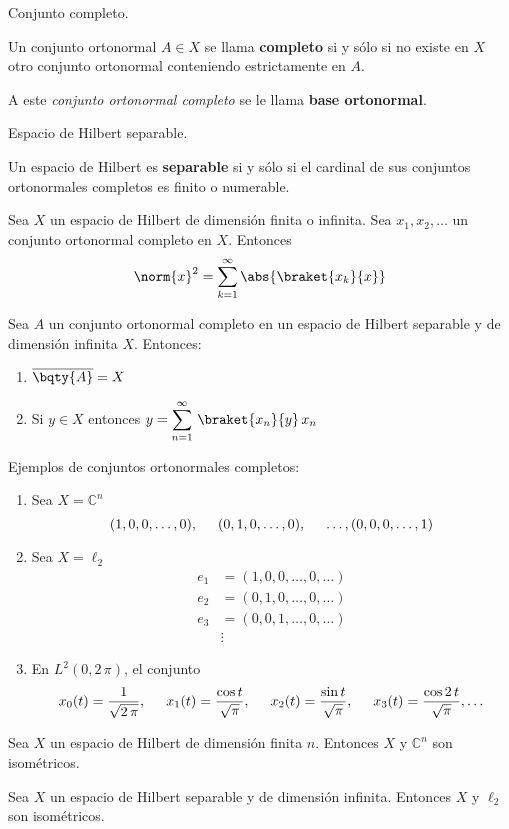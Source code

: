 \begin{defi} Conjunto completo.

Un conjunto ortonormal $A \in X$ se llama \textbf{completo} si y sólo si no existe en $X$ otro conjunto ortonormal conteniendo estrictamente en $A$.

A este \textit{conjunto ortonormal completo} se le llama \textbf{base ortonormal}.
\end{defi}
\begin{defi} Espacio de Hilbert separable.

Un espacio de Hilbert es \textbf{separable} si y sólo si el cardinal de sus conjuntos ortonormales completos es finito o numerable.
\end{defi}
\begin{teo}
Sea $X$ un espacio de Hilbert de dimensión finita o infinita. Sea ${x_{1}, x_{2}, \ldots}$ un conjunto ortonormal completo en $X$. Entonces
\[ \norm{x}^{2} = \sum_{k=1}^{\infty} \abs{\braket{x_{k}}{x}} \]
\end{teo}
\begin{teo}
 Sea $A$ un conjunto ortonormal completo en un espacio de Hilbert separable y de dimensión infinita $X$. Entonces:
 \begin{enumerate}[label=\roman*.]
\item $\overline{\bqty{A}} = X$
\item Si $y \in X$ entonces $\displaystyle{y = \sum_{n=1}^{\infty} \, \braket{x_{n}}{y} \, x_{n}}$
 \end{enumerate}
\end{teo}
Ejemplos de conjuntos ortonormales completos:
\begin{enumerate}
\item Sea $X = \mathbb{C}^{n}$
\[ (1, 0, 0, \ldots, 0), \hspace{0.5cm} (0, 1, 0, \ldots, 0), \hspace{0.5cm} \ldots, (0, 0, 0, \ldots, 1) \]
\item Sea $X = \ell_{2}$
\begin{align*}
e_{1} &=  (1, 0, 0, \ldots, 0, \ldots) \\
e_{2} &=  (0, 1, 0, \ldots, 0, \ldots) \\
e_{3} &=  (0, 0, 1, \ldots, 0, \ldots) \\
&{} \vdots
\end{align*}
\item En $L^{2}(0, 2 \, \pi)$, el conjunto
\[ x_{0}(t) = \dfrac{1}{\sqrt{2 \, \pi}}, \hspace{0.5cm} x_{1}(t) = \dfrac{\cos t}{\sqrt{\pi}}, \hspace{0.5cm} x_{2}(t) = \dfrac{\sin t}{\sqrt{\pi}}, \hspace{0.5cm} x_{3}(t) = \dfrac{\cos 2 \, t}{\sqrt{\pi}}, \ldots\]
\end{enumerate}
\begin{teo}
Sea $X$ un espacio de Hilbert de dimensión finita $n$. Entonces $X$ y $\mathbb{C}^{n}$ son isométricos.
\end{teo}
\begin{teo}
Sea $X$ un espacio de Hilbert separable y de dimensión infinita. Entonces $X$ y $\ell_{2}$ son isométricos.
\end{teo}
